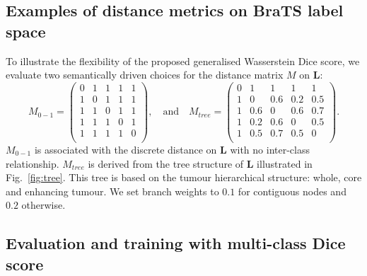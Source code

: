 \documentclass[runningheads,orivec,a4paper]{llncs}
\begin{document}
\subsection{Examples of distance metrics on BraTS label space}
%
To illustrate the flexibility of the proposed generalised Wasserstein
Dice score, we evaluate two semantically driven choices for the
distance matrix $M$ on $\mathbf{L}$: 
\[
M_{0-1}= \begin{pmatrix}
0  & 1 & 1 & 1 & 1 \\
1  & 0 & 1 & 1 & 1 \\
1  & 1 & 0 & 1 & 1 \\
1  & 1 & 1 & 0 & 1 \\
1  & 1 & 1 & 1 & 0 \\
\end{pmatrix}, \quad \textrm{and} \quad
M_{tree}= \begin{pmatrix}
0  & 1 & 1 & 1 & 1 \\
1  & 0 & 0.6 & 0.2 & 0.5 \\
1  & 0.6 & 0 & 0.6 & 0.7 \\
1  & 0.2 & 0.6 & 0 & 0.5 \\
1  & 0.5 & 0.7 & 0.5 & 0 \\
\end{pmatrix}.
\]
$M_{0-1}$ is associated with the discrete distance on $\mathbf{L}$ with no inter-class relationship. 
%
%
$M_{tree}$ is derived from the tree structure of $\mathbf{L}$
illustrated in Fig.~\ref{fig:tree}.
%
This tree is based on the tumour hierarchical structure: whole, core and enhancing tumour. We set branch weights to $0.1$ for contiguous nodes and $0.2$ otherwise.

\subsection{Evaluation and training with multi-class Dice score}
\end{document}
